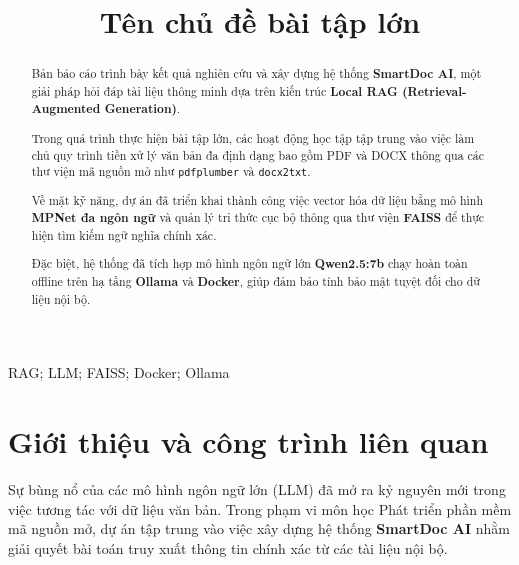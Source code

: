 \documentclass[10pt, conference, a4paper, compsocconf]{IEEEtran}
\begin{document}
\fontsize{10}{12}
\selectfont


\title{Tên chủ đề bài tập lớn}

\author{
}

\maketitle

\begin{abstract}
Bản báo cáo trình bày kết quả nghiên cứu và xây dựng hệ thống \textbf{SmartDoc AI}, một giải pháp hỏi đáp tài liệu thông minh dựa trên kiến trúc \textbf{Local RAG (Retrieval-Augmented Generation)}. 

Trong quá trình thực hiện bài tập lớn, các hoạt động học tập tập trung vào việc làm chủ quy trình tiền xử lý văn bản đa định dạng bao gồm PDF và DOCX thông qua các thư viện mã nguồn mở như \texttt{pdfplumber} và \texttt{docx2txt}. 

Về mặt kỹ năng, dự án đã triển khai thành công việc vector hóa dữ liệu bằng mô hình \textbf{MPNet đa ngôn ngữ} và quản lý tri thức cục bộ thông qua thư viện \textbf{FAISS} để thực hiện tìm kiếm ngữ nghĩa chính xác. 

Đặc biệt, hệ thống đã tích hợp mô hình ngôn ngữ lớn \textbf{Qwen2.5:7b} chạy hoàn toàn offline trên hạ tầng \textbf{Ollama} và \textbf{Docker}, giúp đảm bảo tính bảo mật tuyệt đối cho dữ liệu nội bộ. 
\end{abstract}

\begin{IEEEkeywords}
RAG; LLM; FAISS; Docker; Ollama
\end{IEEEkeywords}

\IEEEpeerreviewmaketitle
\section{Giới thiệu và công trình liên quan}
Sự bùng nổ của các mô hình ngôn ngữ lớn (LLM) đã mở ra kỷ nguyên mới trong việc tương tác với dữ liệu văn bản. Trong phạm vi môn học Phát triển phần mềm mã nguồn mở, dự án tập trung vào việc xây dựng hệ thống \textbf{SmartDoc AI} nhằm giải quyết bài toán truy xuất thông tin chính xác từ các tài liệu nội bộ. 
\end{document}
